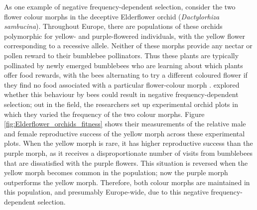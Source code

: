 {\begin{marginfigure}
\end{marginfigure}
As one example of negative frequency-dependent selection, consider the two flower colour morphs in the
deceptive Elderflower orchid ({\it Dactylorhiza
  sambucina}). Throughout Europe, there are populations of these orchids polymorphic for 
yellow- and purple-flowered individuals, with the
yellow flower corresponding to a recessive allele. Neither of
these morphs provide any nectar or pollen reward to their bumblebee
pollinators. 
Thus these plants are typically pollinated by newly emerged
bumblebees who are learning about which plants offer food rewards,
with the bees alternating to try a different coloured flower if they
find no food associated with a particular flower-colour morph \citep{smithson1997negative}. 
\citet{gigord2001negative} explored whether this behaviour by bees
could result in negative frequency-dependent selection; out in the field, the researchers set up
experimental orchid plots in which they varied
the frequency of the two colour morphs. Figure \ref{fig:Elderflower_orchids_fitness} shows their measurements of the relative
male and female reproductive success of the yellow morph across these experimental plots. When the yellow morph is rare, it has
higher reproductive success than the purple morph, as it receives a
disproportionate number of visits from bumblebees that are dissatisfied
with the purple flowers. This situation is reversed when the yellow
morph becomes common in the population; now the purple morph
outperforms the yellow morph. Therefore, both colour morphs are
maintained in this population, and presumably Europe-wide, due to this negative frequency-dependent
selection. %

}
